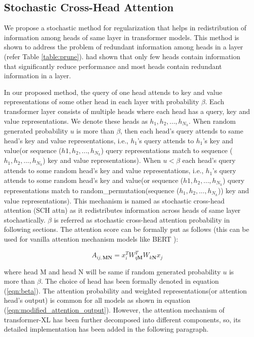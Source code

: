\documentclass[11pt]{article}
\begin{document}
\subsection{Stochastic Cross-Head Attention}



We propose a stochastic method for regularization that helps in redistribution of information among heads of same layer in transformer models. This method is shown to address the problem of redundant information among heads in a layer (refer Table \ref{table:prune}). \citet{DBLP:conf/nips/MichelLN19} had shown that
only few heads contain information that significantly reduce performance and most heads contain redundant information in a layer.

In our proposed method, the query of one head attends to key and value representations of some other head in each layer with probability $\beta$. Each transformer layer consists of multiple heads where each head has a query, key and value representations. We denote these heads as $h_1, h_2, ..., h_{N_h}$. When random generated probability $u$ is more than $\beta$, then each head's query attends to same head's key and value representations, i.e., $h_1$'s query attends to $h_1$'s key and value(or sequence ($h1, h_2, ..., h_{N_h}$) query representations match to sequence ($h_1, h_2, ..., h_{N_h}$) key and value representations).
When $u < \beta$ each head's query attends to some random head's key and value representations, i.e., $h_1$'s query attends to some random head's key and value(or sequence ($h1, h_2, ..., h_{N_h}$) query representations match to random\_permutation(sequence ($h_1, h_2, ..., h_{N_h}$)) key and value representations). This mechanism is named as stochastic cross-head attention (SCH attn) as it redistributes information across heads of same layer stochastically. $\beta$ is referred as stochastic cross-head attention probability in following sections. The attention score can be formally put as follows (this can be used for vanilla attention mechanism models like BERT \citep{DBLP:conf/naacl/DevlinCLT19}): 

\begin{equation}
     A_{ij,\textbf{M}\textbf{N}} = x_{i}^T  W_{q \textbf{M}}^T  W_{k \textbf{N}} x_{j}
\end{equation}

where head M and head N will be same if random generated probability $u$ is more than $\beta$. The choice of head has been formally denoted in equation (\ref{eqn:beta}). The attention probability and weighted representations(or attention head's output) is common for all models as shown in equation (\ref{eqn:modified_attention_output}). However, the attention mechanism of transformer-XL has been further decomposed into different components, so, its detailed implementation has been added in the following paragraph.
\end{document}
